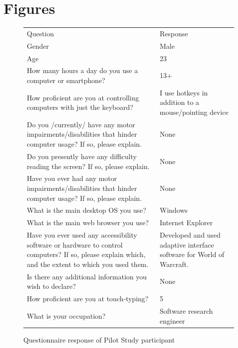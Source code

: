 \documentclass[a4paper, 12pt]{report}
\begin{document}
\chapter{Figures}
\begin{figure}[ht]
\begin{tabular}{l l}
\hline\hline %
Question & Response \\ [0.5ex] %
Gender	&	Male	\\
Age	&	23	\\
How many hours a day do you use a computer or smartphone?	&	13+	\\
How proficient are you at controlling computers with just the keyboard?	&	I use hotkeys in addition to a mouse/pointing device	\\
Do you /currently/ have any motor impairments/disabilities that hinder computer usage? If so, please explain.	&	None	\\
Do you presently have any difficulty reading the screen? If so, please explain.	&	None	\\
Have you ever had any motor impairments/disabilities that hinder computer usage? If so, please explain.	&	None	\\
What is the main desktop OS you use?	&	Windows	\\
What is the main web browser you use?	&	Internet Explorer	\\
Have you ever used any accessibility software or hardware to control computers? If so, please explain which, and the extent to which you used them.	&	Developed and used adaptive interface software for World of Warcraft.	\\
Is there any additional information you wish to declare?	&	None	\\
How proficient are you at touch-typing?	&	5	\\
What is your occupation?	&	Software research engineer	\\ [1ex] %
\hline %
\end{tabular}
\caption{Questionnaire response of Pilot Study participant}
\label{fig:partic_pilotpre}
\end{figure}
\end{document}
